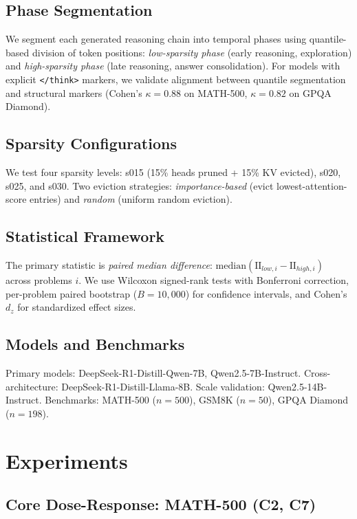 \documentclass[11pt,a4paper]{article}
\begin{document}
\subsection{Phase Segmentation}

We segment each generated reasoning chain into temporal phases using quantile-based division of token positions: \emph{low-sparsity phase} (early reasoning, exploration) and \emph{high-sparsity phase} (late reasoning, answer consolidation). For models with explicit \texttt{</think>} markers, we validate alignment between quantile segmentation and structural markers (Cohen's $\kappa = 0.88$ on MATH-500, $\kappa = 0.82$ on GPQA Diamond).

\subsection{Sparsity Configurations}

We test four sparsity levels: s015 (15\% heads pruned + 15\% KV evicted), s020, s025, and s030. Two eviction strategies: \emph{importance-based} (evict lowest-attention-score entries) and \emph{random} (uniform random eviction).

\subsection{Statistical Framework}

The primary statistic is \emph{paired median difference}: $\text{median}(\text{II}_{low,i} - \text{II}_{high,i})$ across problems $i$. We use Wilcoxon signed-rank tests with Bonferroni correction, per-problem paired bootstrap ($B=10{,}000$) for confidence intervals, and Cohen's $d_z$ for standardized effect sizes.

\subsection{Models and Benchmarks}

Primary models: DeepSeek-R1-Distill-Qwen-7B, Qwen2.5-7B-Instruct. Cross-architecture: DeepSeek-R1-Distill-Llama-8B. Scale validation: Qwen2.5-14B-Instruct. Benchmarks: MATH-500 ($n=500$), GSM8K ($n=50$), GPQA Diamond ($n=198$).

\section{Experiments}

\subsection{Core Dose-Response: MATH-500 (C2, C7)}
\label{sec:dose_response}
\end{document}
